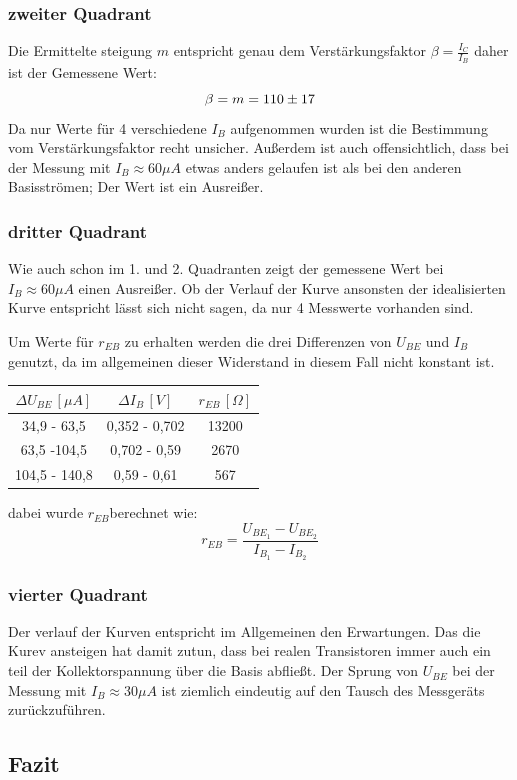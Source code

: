 \subsubsection{zweiter Quadrant}
Die Ermittelte steigung \(m\) entspricht genau dem Verstärkungsfaktor \(\beta = \frac{I_C}{I_B}\) daher ist der Gemessene Wert:
\begin{equation}
\beta = m = 110 \pm 17 \notag
\end{equation}
Da nur Werte für 4 verschiedene \(I_{B}\) aufgenommen wurden ist die Bestimmung vom Verstärkungsfaktor recht unsicher. Außerdem ist auch offensichtlich, dass bei der Messung mit \(I_B \approx 60 \mu A\) etwas anders gelaufen ist als bei den anderen Basisströmen; Der Wert ist ein Ausreißer.
\subsubsection{dritter Quadrant}
Wie auch schon im 1. und 2. Quadranten zeigt der gemessene Wert bei \(I_B \approx 60 \mu A\) einen Ausreißer. Ob der Verlauf der Kurve ansonsten der idealisierten Kurve entspricht lässt sich nicht sagen, da nur 4 Messwerte vorhanden sind.  

Um Werte für \(r_{EB}\) zu erhalten werden die drei Differenzen von \(U_{BE}\) und \(I_{B}\) genutzt, da im allgemeinen dieser Widerstand in diesem Fall nicht konstant ist.
\begin{center}
\begin{tabular}{c|c|c}
\(\Delta U_{BE}\, [\mu A]\) & \(\Delta I_B\, [V]\) &  \(r_{EB}\, [\Omega]\) \\\hline
34,9 - 63,5 & 0,352 - 0,702 & 13200\\
63,5 -104,5 & 0,702 - 0,59 & 2670\\
104,5 - 140,8 & 0,59 - 0,61 & 567
\end{tabular}
\end{center}
dabei wurde \(r_{EB}\)berechnet wie:
\begin{equation}
r_{EB} = \frac{U_{BE_1}-U_{BE_2}}{I_{B_1}-I_{B_2}}
\end{equation}
\subsubsection{vierter Quadrant}
Der verlauf der Kurven entspricht im Allgemeinen den Erwartungen. Das die Kurev ansteigen hat damit zutun, dass bei realen Transistoren immer auch ein teil der Kollektorspannung über die Basis abfließt. Der Sprung von \(U_{BE}\) bei der Messung mit \(I_B \approx 30 \mu A\) ist ziemlich eindeutig auf den Tausch des Messgeräts zurückzuführen.
\subsection{Fazit}